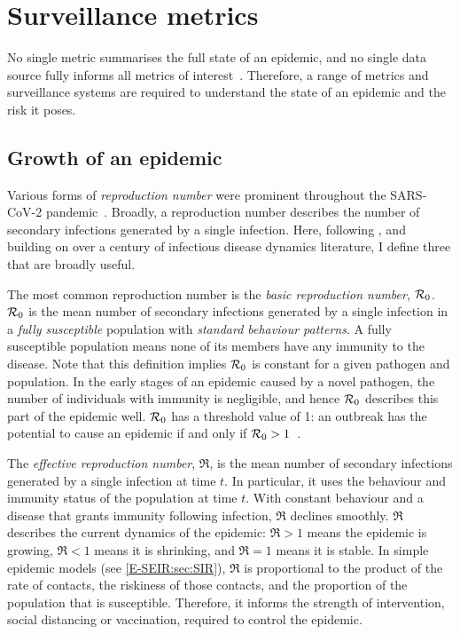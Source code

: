 \documentclass[thesis.tex]{subfiles}
\begin{document}
\section{Surveillance metrics} \label{intro:sec:metrics}

No single metric summarises the full state of an epidemic, and no single data source fully informs all metrics of interest~\autocite{royalSocietyRnumber,pellisEstimation,paragGrowthRates}.
Therefore, a range of metrics and surveillance systems are required to understand the state of an epidemic and the risk it poses.

\subsection{Growth of an epidemic}

Various forms of \emph{reproduction number} were prominent throughout the SARS-CoV-2 pandemic~\autocite{pellisEstimation}.
Broadly, a reproduction number describes the number of secondary infections generated by a single infection.
Here, following \textcite{pellisEstimation}, and building on over a century of infectious disease dynamics literature, I define three that are broadly useful.

The most common reproduction number is the \emph{basic reproduction number}, $\mathcal{R}_{0}$.
$\mathcal{R}_{0}$ is the mean number of secondary infections generated by a single infection in a \emph{fully susceptible} population with \emph{standard behaviour patterns}.
A fully susceptible population means none of its members have any immunity to the disease.
Note that this definition implies $\mathcal{R}_{0}$ is constant for a given pathogen and population.
In the early stages of an epidemic caused by a novel pathogen, the number of individuals with immunity is negligible, and hence $\mathcal{R}_{0}$ describes this part of the epidemic well.
$\mathcal{R}_{0}$ has a threshold value of 1: an outbreak has the potential to cause an epidemic if and only if $\mathcal{R}_{0} > 1$~\autocite[76]{diekmannMathematical}.

The \emph{effective reproduction number}, $\Re$, is the mean number of secondary infections generated by a single infection at time $t$.
In particular, it uses the behaviour and immunity status of the population at time $t$.
With constant behaviour and a disease that grants immunity following infection, $\Re$ declines smoothly.
$\Re$ describes the current dynamics of the epidemic: $\Re > 1$ means the epidemic is growing, $\Re < 1$ means it is shrinking, and $\Re = 1$ means it is stable.
In simple epidemic models (see \cref{E-SEIR:sec:SIR}), $\Re$ is proportional to the product of the rate of contacts, the riskiness of those contacts, and the proportion of the population that is susceptible.
Therefore, it informs the strength of intervention, \eg social distancing or vaccination, required to control the epidemic.
\end{document}
